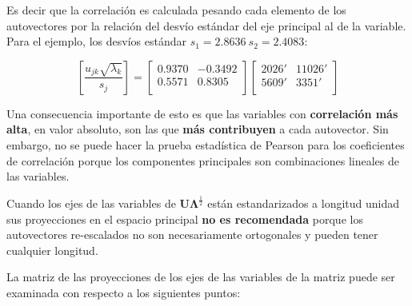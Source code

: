\documentclass[]{book}
\theoremstyle{definition}
\theoremstyle{definition}
\theoremstyle{definition}
\theoremstyle{remark}
\begin{document}
Es decir que la correlación es calculada pesando cada elemento de los
autovectores por la relación del desvío estándar del eje principal al de
la variable. Para el ejemplo, los desvíos estándar
\(s_{1} = 2.8636\ s_{2} = 2.4083\):

\[
\left\lbrack \frac{u_{jk}\sqrt{\lambda_{k}}}{s_{j}} \right\rbrack = \begin{bmatrix}
0.9370 & - 0.3492 \\
0.5571 & 0.8305 \\
\end{bmatrix}\begin{bmatrix}
2026' & 11026' \\
5609' & 3351' \\
\end{bmatrix}
\]

Una consecuencia importante de esto es que las variables con
\textbf{correlación más alta}, en valor absoluto, son las que
\textbf{más contribuyen} a cada autovector. Sin embargo, no se puede
hacer la prueba estadística de Pearson para los coeficientes de
correlación porque los componentes principales son combinaciones
lineales de las variables.

Cuando los ejes de las variables de
\(\mathbf{U}\mathbf{\Lambda}^{\frac{1}{2}}\) están estandarizados a
longitud unidad sus proyecciones en el espacio principal \textbf{no es
recomendada} porque los autovectores re-escalados no son necesariamente
ortogonales y pueden tener cualquier longitud.

La matriz de las proyecciones de los ejes de las variables de la matriz
puede ser examinada con respecto a los siguientes puntos:
\end{document}
